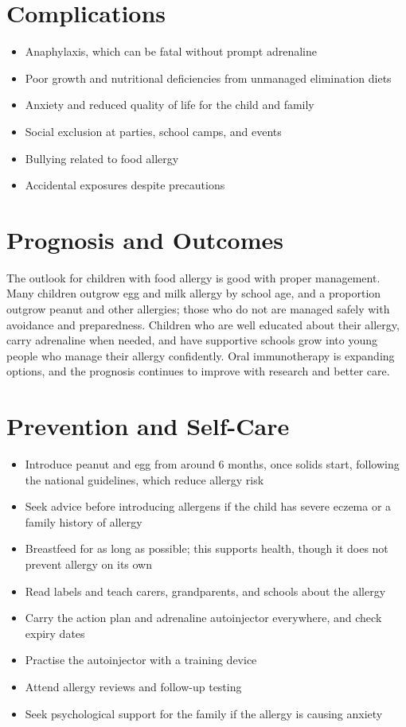 \section*{Complications}
\begin{itemize}
    \item Anaphylaxis, which can be fatal without prompt adrenaline
    \item Poor growth and nutritional deficiencies from unmanaged elimination diets
    \item Anxiety and reduced quality of life for the child and family
    \item Social exclusion at parties, school camps, and events
    \item Bullying related to food allergy
    \item Accidental exposures despite precautions
\end{itemize}

\section*{Prognosis and Outcomes}
The outlook for children with food allergy is good with proper management. Many children outgrow egg and milk allergy by school age, and a proportion outgrow peanut and other allergies; those who do not are managed safely with avoidance and preparedness. Children who are well educated about their allergy, carry adrenaline when needed, and have supportive schools grow into young people who manage their allergy confidently. Oral immunotherapy is expanding options, and the prognosis continues to improve with research and better care.

\section*{Prevention and Self-Care}
\begin{itemize}
    \item Introduce peanut and egg from around 6 months, once solids start, following the national guidelines, which reduce allergy risk
    \item Seek advice before introducing allergens if the child has severe eczema or a family history of allergy
    \item Breastfeed for as long as possible; this supports health, though it does not prevent allergy on its own
    \item Read labels and teach carers, grandparents, and schools about the allergy
    \item Carry the action plan and adrenaline autoinjector everywhere, and check expiry dates
    \item Practise the autoinjector with a training device
    \item Attend allergy reviews and follow-up testing
    \item Seek psychological support for the family if the allergy is causing anxiety
\end{itemize}

